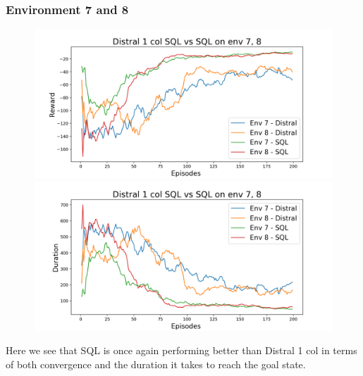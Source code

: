 \documentclass[12pt]{report}
\begin{document}
\subsubsection{Environment 7 and 8}
\begin{figure}[H]
\centering
\begin{minipage}{.5\textwidth}
\centering
\includegraphics[width=\textwidth]{figs/d1_col_sql/d1_col_sql_7_8_rwd.png}
\end{minipage}%
\centering
\begin{minipage}{.5\textwidth}
\centering
\includegraphics[width=\textwidth]{figs/d1_col_sql/d1_col_sql_7_8_dur.png}
\end{minipage}%
\end{figure}
Here we see that SQL is once again performing better than Distral 1 col in terms of both convergence and the duration it takes to reach the goal state.
\end{document}
